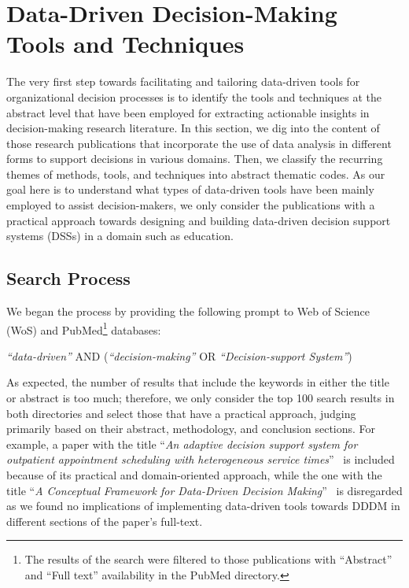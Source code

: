 \documentclass{sfuthesis}
\begin{document}
\section{Data-Driven Decision-Making Tools and Techniques}
The very first step towards facilitating and tailoring data-driven tools for organizational decision processes is to identify the tools and techniques at the abstract level that have been employed for extracting actionable insights in decision-making research literature. In this section, we dig into the content of those research publications that incorporate the use of data analysis in different forms to support decisions in various domains. Then, we classify the recurring themes of methods, tools, and techniques into abstract thematic codes. As our goal here is to understand what types of data-driven tools have been mainly employed to assist decision-makers, we only consider the publications with a practical approach towards designing and building data-driven decision support systems (DSSs) in a domain such as education.
\subsection{Search Process}
We began the process by providing the following prompt to Web of Science (WoS) and PubMed\footnote{The results of the search were filtered to those publications with “Abstract” and “Full text” availability in the PubMed directory.} databases:\par
\begin{center}
\textit{“data-driven”} AND (\textit{“decision-making”} OR \textit{“Decision-support System”})
\end{center}
As expected, the number of results that include the keywords in either the title or abstract is too much; therefore, we only consider the top 100 search results in both directories and select those that have a practical approach, judging primarily based on their abstract, methodology, and conclusion sections. For example, a paper with the title “\textit{An adaptive decision support system for outpatient appointment scheduling with heterogeneous service times}”~\cite{feng2024adaptive} is included because of its practical and domain-oriented approach, while the one with the title “\textit{A Conceptual Framework for Data-Driven Decision Making}”~\cite{gill_conceptual_2014} is disregarded as we found no implications of implementing data-driven tools towards DDDM in different sections of the paper’s full-text.
\end{document}
